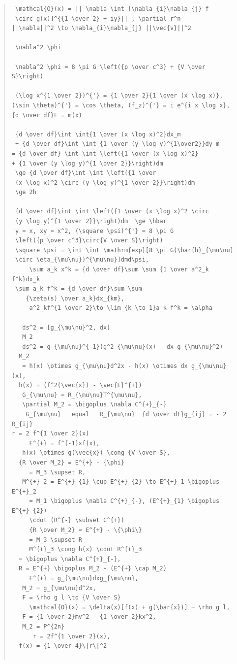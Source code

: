 \documentclass{jsarticle}
\begin{document}
{\begin{quote}
\begin{verbatim}
 \mathcal{O}(x) = || \nabla \int [\nabla_{i}\nabla_{j} f 
 \circ g(x)]^{{1 \over 2} + iy}|| , \partial r^n 
||\nabla||^2 \to \nabla_{i}\nabla_{j} ||\vec{v}||^2 

 \nabla^2 \phi 

 \nabla^2 \phi = 8 \pi G \left({p \over c^3} + {V \over S}\right) 

 (\log x^{1 \over 2})^{'} = {1 \over 2}{1 \over (x \log x)},
(\sin \theta)^{'} = \cos \theta, (f_z)^{'} = i e^{i x \log x}, 
{d \over df}F = m(x) 

 {d \over df}\int \int{1 \over (x \log x)^2}dx_m 
 + {d \over df}\int \int {1 \over (y \log y)^{1\over2}}dy_m
= {d \over df} \int \int \left({1 \over (x \log x)^2} 
+ {1 \over (y \log y)^{1 \over 2}}\right)dm  
 \ge {d \over df}\int \int \left({1 \over 
 (x \log x)^2 \circ (y \log y)^{1 \over 2}}\right)dm 
 \ge 2h

 {d \over df}\int \int \left({1 \over (x \log x)^2 \circ 
 (y \log y)^{1 \over 2}}\right)dm  \ge \hbar 
 y = x, xy = x^2, (\square \psi)^{'} = 8 \pi G
 \left({p \over c^3}\circ{V \over S}\right) 
 \square \psi = \int \int \mathrm{exp}[8 \pi G(\bar{h}_{\mu\nu}
 \circ \eta_{\mu\nu})^{\mu\nu}]dmd\psi,
	 \sum a_k x^k = {d \over df}\sum \sum {1 \over a^2_k f^k}dx_k
 \sum a_k f^k = {d \over df}\sum \sum
	{\zeta(s) \over a_k}dx_{km}, 
	 a^2_kf^{1 \over 2}\to \lim_{k \to 1}a_k f^k = \alpha 

   ds^2 = [g_{\mu\nu}^2, dx] 
   M_2 
   ds^2 = g_{\mu\nu}^{-1}(g^2_{\mu\nu}(x) - dx g_{\mu\nu}^2) 
  M_2  
   = h(x) \otimes g_{\mu\nu}d^2x - h(x) \otimes dx g_{\mu\nu}(x),
  h(x) = (f^2(\vec{x}) - \vec{E}^{+}) 
   G_{\mu\nu} = R_{\mu\nu}T^{\mu\nu},
   \partial M_2 = \bigoplus \nabla C^{+}_{-}   
    G_{\mu\nu}   equal   R_{\mu\nu}  {d \over dt}g_{ij} = - 2 R_{ij} 
r = 2 f^{1 \over 2}(x)
     E^{+} = f^{-1}xf(x), 
   h(x) \otimes g(\vec{x}) \cong {V \over S},
  {R \over M_2} = E^{+} - {\phi}   
     = M_3 \supset R,
   M^{+}_2 = E^{+}_{1} \cup E^{+}_{2} \to E^{+}_1 \bigoplus E^{+}_2   
     = M_1 \bigoplus \nabla C^{+}_{-}, (E^{+}_{1} \bigoplus E^{+}_{2}) 
     \cdot (R^{-} \subset C^{+})   
     {R \over M_2} = E^{+} - \{\phi\}   
     = M_3 \supset R   
     M^{+}_3 \cong h(x) \cdot R^{+}_3
  = \bigoplus \nabla C^{+}_{-}, 
  R = E^{+} \bigoplus M_2 - (E^{+} \cap M_2)   
     E^{+} = g_{\mu\nu}dxg_{\mu\nu},
   M_2 = g_{\mu\nu}d^2x,
   F = \rho g l \to {V \over S}   
     \mathcal{O}(x) = \delta(x)[f(x) + g(\bar{x})] + \rho g l,
   F = {1 \over 2}mv^2 - {1 \over 2}kx^2,
   M_2 = P^{2n}   
      r = 2f^{1 \over 2}(x),
  f(x) = {1 \over 4}\|r\|^2   


\end{verbatim}
\end{quote}}
\end{document}
